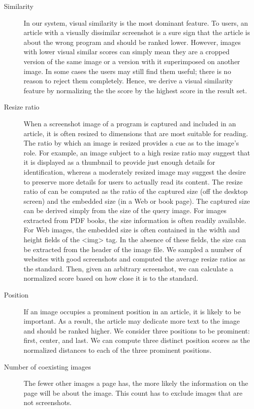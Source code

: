 \documentclass{www2010-submission}
\begin{document}
\begin{description}

\item[Similarity] In our system, visual similarity is the most
  dominant feature. To users, an article with a visually dissimilar
  screenshot is a sure sign that the article is about the wrong
  program and should be ranked lower. However, images with lower
  visual similar scores can simply mean they are a cropped version of
  the same image or a version with it superimposed on another
  image. In some cases the users may still find them useful; there is
  no reason to reject them completely. Hence, we derive a visual
  similarity feature by normalizing the the score by the highest score
  in the result set.

\item[Resize ratio] When a screenshot image of a program is captured
  and included in an article, it is often resized to dimensions that
  are most suitable for reading. The ratio by which an image is
  resized provides a cue as to the image's role. For example, an image
  subject to a high resize ratio may suggest that it is displayed as a
  thumbnail to provide just enough details for identification, whereas
  a moderately resized image may suggest the desire to preserve more
  details for users to actually read its content. The resize ratio of
  can be computed as the ratio of the captured size (off the desktop
  screen) and the embedded size (in a Web or book page). The captured
  size can be derived simply from the size of the query image. For
  images extracted from PDF books, the size information is often
  readily available. For Web images, the embedded size is often
  contained in the width and height fields of the <img> tag. In the
  absence of these fields, the size can be extracted from the header
  of the image file. We sampled a number of websites with good
  screenshots and computed the average resize ratios as the standard.
  Then, given an arbitrary screenshot, we can calculate a normalized
  score based on how close it is to the standard.

\item[Position] If an image occupies a prominent position in an
  article, it is likely to be important. As a result, the article may
  dedicate more text to the image and should be ranked higher.  We
  consider three positions to be prominent: first, center, and
  last. We can compute three distinct position scores as the
  normalized distances to each of the three prominent positions.

\item[Number of coexisting images] The fewer other images a page has,
  the more likely the information on the page will be about the
  image. This count has to exclude images that are not screenshots.

\end{description}
\end{document}
